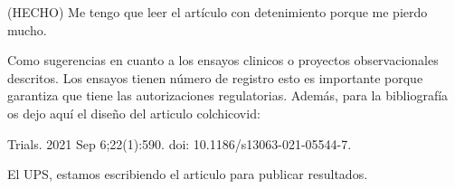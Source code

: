 (HECHO)
Me tengo que leer el artículo con detenimiento porque me pierdo mucho.

Como sugerencias en cuanto a los ensayos clinicos o proyectos observacionales descritos. Los ensayos tienen número de registro esto es importante porque garantiza que tiene las autorizaciones regulatorias. Además, para la bibliografía os dejo aquí el diseño del articulo colchicovid:

 

Trials. 2021 Sep 6;22(1):590. doi: 10.1186/s13063-021-05544-7.

 

El UPS, estamos escribiendo el articulo para publicar resultados.